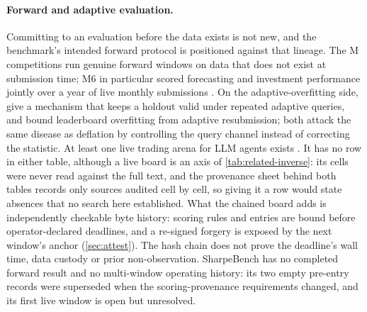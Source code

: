 \paragraph{Forward and adaptive evaluation.} Committing to an evaluation before the data exists is not new, and the benchmark's intended forward protocol is positioned against that lineage. The M competitions run genuine forward windows on data that does not exist at submission time; M6 in particular scored forecasting and investment performance jointly over a year of live monthly submissions \citep{makridakis2025m6}. On the adaptive-overfitting side, \citet{dwork2015holdout} give a mechanism that keeps a holdout valid under repeated adaptive queries, and \citet{blum2015ladder} bound leaderboard overfitting from adaptive resubmission; both attack the same disease as deflation by controlling the query channel instead of correcting the statistic. At least one live trading arena for LLM agents exists \citep{deepfund2025}. It has no row in either table, although a live board is an axis of \cref{tab:related-inverse}: its cells were never read against the full text, and the provenance sheet behind both tables records only sources audited cell by cell, so giving it a row would state absences that no search here established. What the chained board adds is independently checkable byte history: scoring rules and entries are bound before operator-declared deadlines, and a re-signed forgery is exposed by the next window's anchor (\cref{sec:attest}). The hash chain does not prove the deadline's wall time, data custody or prior non-observation. SharpeBench has no completed forward result and no multi-window operating history: its two empty pre-entry records were superseded when the scoring-provenance requirements changed, and its first live window is open but unresolved.

